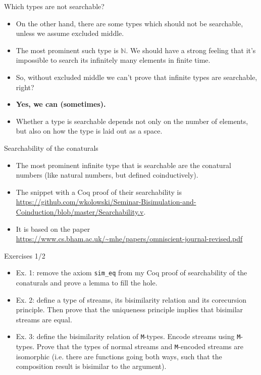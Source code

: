 \documentclass{beamer}
\begin{document}
\begin{frame}{Which types are not searchable?}
\begin{itemize}
	\item On the other hand, there are some types which should not be searchable, unless we assume excluded middle.
	\item The most prominent such type is $\mathbb{N}$. We should have a strong feeling that it's impossible to search its infinitely many elements in finite time.
	\item So, without excluded middle we can't prove that infinite types are searchable, right?
	\item \textbf{Yes, we can (sometimes).}
	\item Whether a type is searchable depends not only on the number of elements, but also on how the type is laid out as a space.
\end{itemize}
\end{frame}

\begin{frame}{Searchability of the conaturals}
\begin{itemize}
	\item The most prominent infinite type that is searchable are the conatural numbers (like natural numbers, but defined coinductively).
	\item The snippet with a Coq proof of their searchability is \url{https://github.com/wkolowski/Seminar-Bisimulation-and-Coinduction/blob/master/Searchability.v}.
	\item It is based on the paper \url{https://www.cs.bham.ac.uk/~mhe/papers/omniscient-journal-revised.pdf}
\end{itemize}
\end{frame}

\begin{frame}{Exercises 1/2}
\begin{itemize}
	\item Ex. 1: remove the axiom \texttt{sim\_eq} from my Coq proof of searchability of the conaturals and prove a lemma to fill the hole.
	\item Ex. 2: define a type of streams, its bisimilarity relation and its corecursion principle. Then prove that the uniqueness principle implies that bisimilar streams are equal.
	\item Ex. 3: define the bisimilarity relation of \texttt{M}-types. Encode streams using \texttt{M}-types. Prove that the types of normal streams and \texttt{M}-encoded streams are isomorphic (i.e. there are functions going both ways, such that the composition result is bisimilar to the argument).
\end{itemize}
\end{frame}
\end{document}
